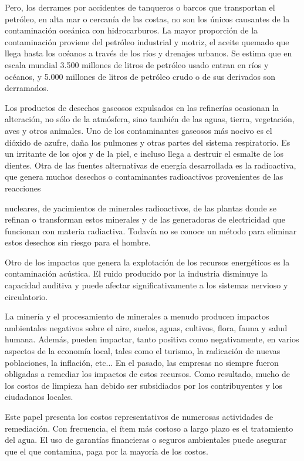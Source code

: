 Pero, los derrames por accidentes de tanqueros o barcos que transportan el petróleo, en alta mar
o cercanía de las costas, no son los únicos causantes de la contaminación oceánica
con hidrocarburos. La mayor proporción de la contaminación proviene del petróleo
industrial y motriz, el aceite quemado que llega hasta los océanos a través de los ríos y
drenajes urbanos. Se estima que en escala mundial 3.500 millones de litros de petróleo
usado entran en ríos y océanos, y 5.000 millones de litros de petróleo crudo o de sus
derivados son derramados.

Los productos de desechos gaseosos expulsados en las refinerías ocasionan la
alteración, no sólo de la atmósfera, sino también de las aguas, tierra, vegetación, aves y
otros animales. Uno de los contaminantes gaseosos más nocivo es el dióxido de azufre,
daña los pulmones y otras partes del sistema respiratorio. Es un irritante de los ojos y
de la piel, e incluso llega a destruir el esmalte de los dientes.
Otra de las fuentes alternativas de energía desarrollada es la radioactiva, que
genera muchos desechos o contaminantes radioactivos provenientes de las reacciones

nucleares, de yacimientos de minerales radioactivos, de las plantas donde se refinan o
transforman estos minerales y de las generadoras de electricidad que funcionan con
materia radiactiva. Todavía no se conoce un método para eliminar estos desechos sin
riesgo para el hombre.

Otro de los impactos que genera la explotación de los recursos energéticos es la
contaminación acústica. El ruido producido por la industria disminuye la capacidad
auditiva y puede afectar significativamente a los sistemas nervioso y circulatorio.

La minería y el procesamiento de minerales a menudo producen impactos
ambientales negativos sobre el aire, suelos, aguas, cultivos, flora, fauna y salud
humana. Además, pueden impactar, tanto positiva como negativamente, en varios
aspectos de la economía local, tales como el turismo, la radicación de nuevas
poblaciones, la inflación, etc$\dots$ En el pasado, las empresas no siempre fueron obligadas a
remediar los impactos de estos recursos. Como resultado, mucho de los costos de
limpieza han debido ser subsidiados por los contribuyentes y los ciudadanos locales.

Este papel presenta los costos representativos de numerosas actividades de
remediación. Con frecuencia, el ítem más costoso a largo plazo es el tratamiento del
agua. El uso de garantías financieras o seguros ambientales puede asegurar que el que
contamina, paga por la mayoría de los costos.

